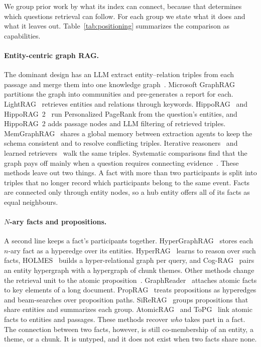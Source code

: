 \documentclass[sigconf, review, anonymous]{acmart}
\begin{document}
We group prior work by what its index can connect, because that determines which questions retrieval can follow. For each group we state what it does and what it leaves out. Table~\ref{tab:positioning} summarizes the comparison as capabilities.

\paragraph{Entity-centric graph RAG.}
The dominant design has an LLM extract entity--relation triples from each passage and merge them into one knowledge graph~\cite{bian2025llm,zhang2024extract,mo2025kggen,lairgi2024itext2kg}. Microsoft GraphRAG~\cite{edge2024local} partitions the graph into communities and pre-generates a report for each. LightRAG~\cite{guo2024lightrag} retrieves entities and relations through keywords. HippoRAG~\cite{gutierrez2024hipporag} and HippoRAG~2~\cite{gutierrez2025rag} run Personalized PageRank from the question's entities, and HippoRAG~2 adds passage nodes and LLM filtering of retrieved triples. MemGraphRAG~\cite{wu2026memgraphrag} shares a global memory between extraction agents to keep the schema consistent and to resolve conflicting triples. Iterative reasoners~\cite{sun2023think,ma2024think,luo2023reasoning} and learned retrievers~\cite{mavromatis2024gnn} walk the same triples. Systematic comparisons find that the graph pays off mainly when a question requires connecting evidence~\cite{zhou2025indepth,xiang2025when}. These methods leave out two things. A fact with more than two participants is split into triples that no longer record which participants belong to the same event. Facts are connected only through entity nodes, so a hub entity offers all of its facts as equal neighbours.

\paragraph{$N$-ary facts and propositions.}
A second line keeps a fact's participants together. HyperGraphRAG~\cite{luo2025hypergraphrag} stores each $n$-ary fact as a hyperedge over its entities. HyperRAG~\cite{lien2026hyperrag} learns to reason over such facts, HOLMES~\cite{panda2024holmes} builds a hyper-relational graph per query, and Cog-RAG~\cite{hu2026cograg} pairs an entity hypergraph with a hypergraph of chunk themes. Other methods change the retrieval unit to the atomic proposition~\cite{chen2024dense,min2023factscore}. GraphReader~\cite{li2024graphreader} attaches atomic facts to key elements of a long document. PropRAG~\cite{wang2025proprag} treats propositions as hyperedges and beam-searches over proposition paths. SiReRAG~\cite{zhang2025sirerag} groups propositions that share entities and summarizes each group. AtomicRAG~\cite{hou2026atomicrag} and ToPG~\cite{delmas2026topg} link atomic facts to entities and passages. These methods recover \emph{who} takes part in a fact. The connection between two facts, however, is still co-membership of an entity, a theme, or a chunk. It is untyped, and it does not exist when two facts share none.
\end{document}
